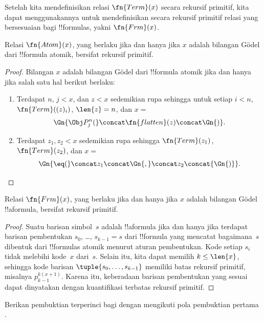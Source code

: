 \documentclass[../../../include/open-logic-section]{subfiles}
\begin{document}

Setelah kita mendefinisikan relasi $\fn{Term}(x)$ secara rekursif primitif,
kita dapat menggunakannya untuk mendefinisikan secara rekursif primitif relasi
yang bersesuaian bagi !!{formula}s, yakni $\fn{Frm}(x)$.

\begin{prop}
Relasi $\fn{Atom}(x)$, yang berlaku jika dan hanya jika $x$ adalah bilangan
G\"odel dari !!{formula} atomik, bersifat rekursif primitif.
\end{prop}

\begin{proof}
Bilangan $x$ adalah bilangan G\"odel dari !!{formula} atomik jika dan hanya jika
salah satu hal berikut berlaku:
\begin{enumerate}
\item Terdapat $n$, $j < x$, dan $z < x$ sedemikian rupa sehingga untuk setiap
  $i < n$, $\fn{Term}((z)_i)$, $\len{z}=n$, dan $x = $
\[
\Gn{\Obj P^n_j(} \concat \fn{flatten}(z) \concat \Gn{)}.
\]
\item Terdapat $z_1, z_2 < x$ sedemikian rupa sehingga $\fn{Term}(z_1)$,
  $\fn{Term}(z_2)$, dan $x = $
\[
\Gn{{\eq}(} \concat z_1 \concat \Gn{,} \concat z_2 \concat{\Gn{)}}.
\]
\end{enumerate}
\end{proof}

\begin{prop}
Relasi $\fn{Frm}(x)$, yang berlaku jika dan hanya jika $x$ adalah bilangan
G\"odel !!a{formula}, bersifat rekursif primitif.
\end{prop}

\begin{proof}
Suatu barisan simbol~$s$ adalah !!a{formula} jika dan hanya jika terdapat
barisan pembentukan $s_0$, \dots, $s_{k-1} = s$ dari !!{formula} yang mencatat
bagaimana~$s$ dibentuk dari !!{formula}s atomik menurut aturan pembentukan.
Kode setiap $s_i$ tidak melebihi kode~$x$ dari~$s$. Selain itu, kita dapat
memilih $k \le \len{x}$, sehingga kode barisan
$\tuple{s_0, \dots, s_{k-1}}$ memiliki batas rekursif primitif,
misalnya $p_{k-1}^{k(x+1)}$. Karena itu, keberadaan barisan pembentukan yang
sesuai dapat dinyatakan dengan kuantifikasi terbatas rekursif primitif.
\end{proof}

\begin{prob}
Berikan pembuktian terperinci bagi
 dengan mengikuti pola pembuktian
pertama .
\end{prob}
\end{document}
